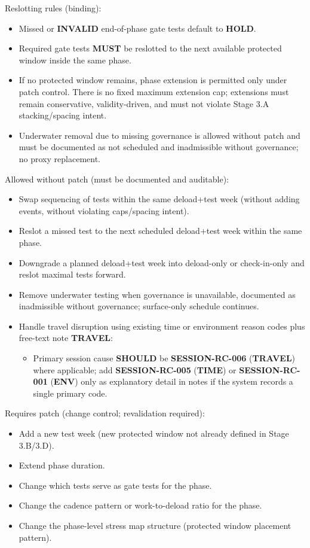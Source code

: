 \documentclass[10pt]{article}
\begin{document}
Reslotting rules (binding):

\begin{itemize}
\item Missed or \textbf{INVALID} end-of-phase gate tests default to \textbf{HOLD}.
\item Required gate tests \textbf{MUST} be reslotted to the next available protected window inside the same phase.
\item If no protected window remains, phase extension is permitted only under patch control. There is no fixed maximum extension cap; extensions must remain conservative, validity-driven, and must not violate Stage 3.A stacking/spacing intent.
\item Underwater removal due to missing governance is allowed without patch and must be documented as not scheduled and inadmissible without governance; no proxy replacement.
\end{itemize}

Allowed without patch (must be documented and auditable):

\begin{itemize}
\item Swap sequencing of tests within the same deload+test week (without adding events, without violating caps/spacing intent).
\item Reslot a missed test to the next scheduled deload+test week within the same phase.
\item Downgrade a planned deload+test week into deload-only or check-in-only and reslot maximal tests forward.
\item Remove underwater testing when governance is unavailable, documented as inadmissible without governance; surface-only schedule continues.
\item Handle travel disruption using existing time or environment reason codes plus free-text note \textbf{TRAVEL}:
\begin{itemize}
\item Primary session cause \textbf{SHOULD} be \textbf{SESSION-RC-006} (\textbf{TRAVEL}) where applicable; add \textbf{SESSION-RC-005} (\textbf{TIME}) or \textbf{SESSION-RC-001} (\textbf{ENV}) only as explanatory detail in notes if the system records a single primary code.
\end{itemize}
\end{itemize}

Requires patch (change control; revalidation required):

\begin{itemize}
\item Add a new test week (new protected window not already defined in Stage 3.B/3.D).
\item Extend phase duration.
\item Change which tests serve as gate tests for the phase.
\item Change the cadence pattern or work-to-deload ratio for the phase.
\item Change the phase-level stress map structure (protected window placement pattern).
\end{itemize}
\end{document}
